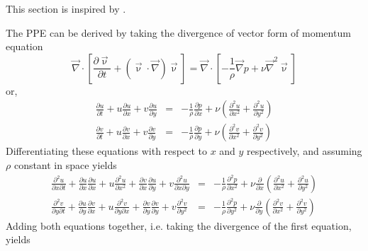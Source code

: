 This section is inspired by \textcite{sali13}.

The PPE can be derived by taking the divergence of vector form of momentum equation
\begin{equation}
\vec\nabla \cdot \left[ 
\frac{\partial \vec\upnu}{\partial t} + (\vec\upnu\cdot\vec\nabla) \vec\upnu \right] 
=
\vec\nabla \cdot \left[ - \frac{1}{\rho }\vec\nabla p +  \nu \vec\nabla^2 \vec\upnu  \right] 
\label{eq:sf10}
\end{equation}
or,
\begin{eqnarray}
\frac{\partial u}{\partial t}  + u \frac{\partial u}{\partial x}+ v \frac{\partial u}{\partial y}
&=& -\frac{1}{\rho} \frac{\partial p}{\partial x} 
+ \nu \left( \frac{\partial^2 u}{\partial x^2} + \frac{\partial^2 u}{\partial y^2} \right) \\
\frac{\partial v}{\partial t}  + u \frac{\partial v}{\partial x}+ v \frac{\partial v}{\partial y}
&=& -\frac{1}{\rho} \frac{\partial p}{\partial y} 
+ \nu \left( \frac{\partial^2 v}{\partial x^2} + \frac{\partial^2 v}{\partial y^2} \right) 
\end{eqnarray}
Differentiating these equations with respect to $x$ and $y$ respectively, and assuming $\rho$ constant in 
space yields
\begin{eqnarray}
\frac{\partial^2 u}{\partial x \partial t}  
+ \frac{\partial u}{\partial x} \frac{\partial u}{\partial x}+ u \frac{\partial^2 u}{\partial x^2}
+ \frac{\partial v}{\partial x} \frac{\partial u}{\partial y}+ v \frac{\partial^2 u}{\partial x\partial y}
&=& 
-\frac{1}{\rho} \frac{\partial^2 p}{\partial x^2} 
+ \nu \frac{\partial }{\partial x} \left( \frac{\partial^2 u}{\partial x^2} + \frac{\partial^2 u}{\partial y^2} \right) 
\\
\frac{\partial^2 v}{\partial y \partial t}  
+ \frac{\partial u}{\partial y} \frac{\partial v}{\partial x}+ u \frac{\partial^2 v}{\partial y\partial x}
+ \frac{\partial v}{\partial y} \frac{\partial v}{\partial y}+ v \frac{\partial^2 v}{\partial y^2}
&=& 
-\frac{1}{\rho} \frac{\partial^2 p}{\partial y^2} 
+ \nu \frac{\partial }{\partial y}  \left( \frac{\partial^2 v}{\partial x^2} + \frac{\partial^2 v}{\partial y^2} \right) 
\end{eqnarray}
Adding both equations together, i.e. taking the divergence of the first equation, yields
